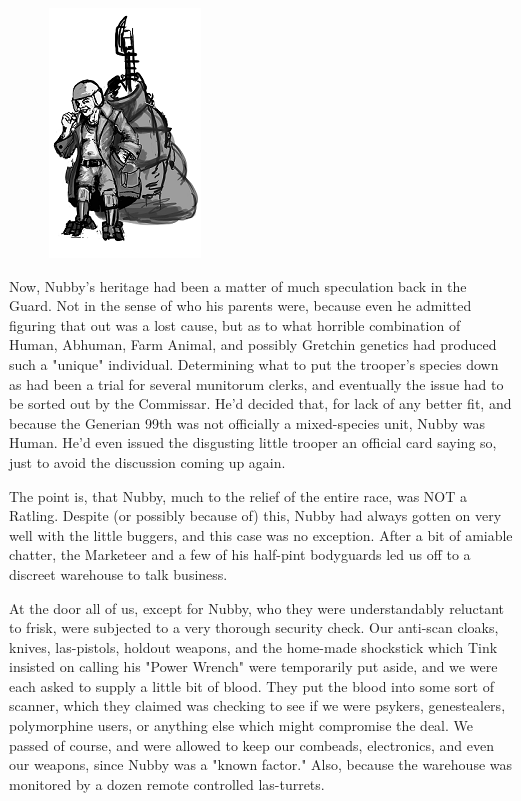 \begin{figure}
	\begin{center}
		\includegraphics[width=\figwidth]{pics/14/18.png}
	\end{center}
\end{figure}
Now, Nubby's heritage had been a matter of much speculation back in the Guard. 
Not in the sense of who his parents were, because even he admitted figuring that out was a lost cause, but as to what horrible combination of Human, Abhuman, Farm Animal, and possibly Gretchin genetics had produced such a "unique" individual. 
Determining what to put the trooper's species down as had been a trial for several munitorum clerks, and eventually the issue had to be sorted out by the Commissar. 
He'd decided that, for lack of any better fit, and because the Generian 99th was not officially a mixed-species unit, Nubby was Human. 
He'd even issued the disgusting little trooper an official card saying so, just to avoid the discussion coming up again.

The point is, that Nubby, much to the relief of the entire race, was NOT a Ratling. 
Despite (or possibly because of) this, Nubby had always gotten on very well with the little buggers, and this case was no exception. 
After a bit of amiable chatter, the Marketeer and a few of his half-pint bodyguards led us off to a discreet warehouse to talk business. 


At the door all of us, except for Nubby, who they were understandably reluctant to frisk, were subjected to a very thorough security check. 
Our anti-scan cloaks, knives, las-pistols, holdout weapons, and the home-made shockstick which Tink insisted on calling his "Power Wrench" were temporarily put aside, and we were each asked to supply a little bit of blood. 
They put the blood into some sort of scanner, which they claimed was checking to see if we were psykers, genestealers, polymorphine users, or anything else which might compromise the deal. 
We passed of course, and were allowed to keep our combeads, electronics, and even our weapons, since Nubby was a "known factor." Also, because the warehouse was monitored by a dozen remote controlled las-turrets.

